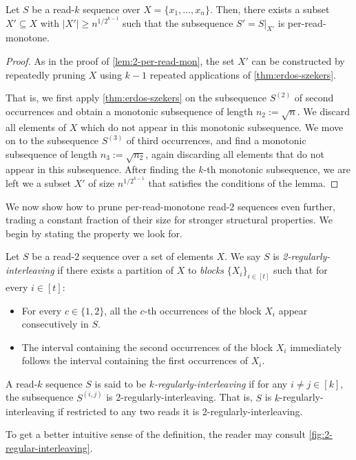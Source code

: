 \documentclass[11pt]{article}
\begin{document}
\begin{lemma}
\label{lem:k-per-read-mon}
Let $S$ be a read-$k$ sequence over $X=\{x_1, \ldots, x_n\}$. Then, there exists a subset $X' \subseteq X$ with $|X'| \ge n^{1/2^{k-1}} $ such that the subsequence $S'=S|_{X'}$ is per-read-monotone.
\end{lemma}
\begin{proof}
As in the proof of \autoref{lem:2-per-read-mon}, the set $X'$ can be constructed by repeatedly pruning $X$ using $k-1$ repeated applications of \autoref{thm:erdos-szekers}.

That is, we first apply \autoref{thm:erdos-szekers} on the subsequence $S^{(2)}$ of second occurrences and obtain a monotonic subsequence of length $n_2 := \sqrt{n}$. We discard all elements of $X$ which do not appear in this monotonic subsequence. We move on to the subsequence $S^{(3)}$ of third occurrences, and find a monotonic subsequence of length $n_3 := \sqrt{n_2}$, again discarding all elements that do not appear in this subsequence. After finding the $k$-th monotonic subsequence, we are left we a subset $X'$ of size $n^{1/2^{k-1}}$ that satisfies the conditions of the lemma.
\end{proof}

We now show how to prune per-read-monotone read-$2$ sequences even further, trading a constant fraction of their size for stronger structural properties. We begin by stating the property we look for.

\begin{definition}
\label{def:regularly-interleaving}
Let $S$ be a read-$2$ sequence over a set of elements $X$. We say $S$ is {\em 2-regularly-interleaving} if there exists a partition of $X$ to {\em blocks} $\{X_i\}_{i \in [t]}$ such that for every $i \in [t]$:
\begin{itemize}
\item For every $c \in \{1,2\}$, all the $c$-th occurrences of the block $X_i$ appear consecutively in $S$.
\item The interval containing the second occurrences of the block $X_i$ immediately follows the interval containing the first occurrences of $X_{i}$. 
\end{itemize}
A read-$k$ sequence $S$ is said to be {\em $k$-regularly-interleaving} if for any $i \neq j \in [k]$, the subsequence $S^{(i,j)}$ is 2-regularly-interleaving. That is, $S$ is $k$-regularly-interleaving if restricted to any two reads it is 2-regularly-interleaving.
\end{definition}
To get a better intuitive sense of the definition, the reader may consult \autoref{fig:2-regular-interleaving}.
\end{document}
